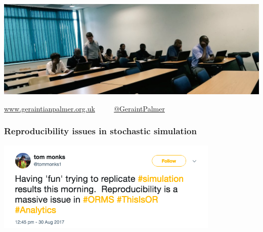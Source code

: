 \documentclass{beamer}
\begin{document}
\begin{frame}
\begin{columns}
\begin{column}{0.5\textwidth}
\begin{center}
{\begin{tikzpicture}
          \end{tikzpicture}
        }
      \end{center}
    \end{column}
  \end{columns}
\end{frame}

\begin{frame}
\begin{center}
\includegraphics[width=\textwidth]{workshop}
\end{center}
\vspace{10mm}
\textcolor{darkorange}{\url{www.geraintianpalmer.org.uk} $\quad \quad$ \href{https://twitter.com/GeraintPalmer}{@GeraintPalmer}}
\end{frame}

\begin{frame}
  \frametitle{Reproducibility issues in stochastic simulation}
  \begin{center}
    \includegraphics[width=0.8\textwidth]{reproducibility_tweet}
  \end{center}
\end{frame}
\end{document}
